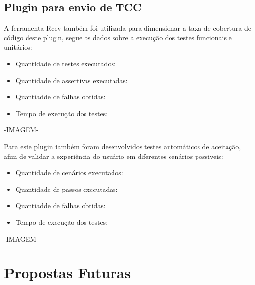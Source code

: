 \subsection{Plugin para envio de TCC}

A ferramenta Rcov também foi utilizada para dimensionar a taxa de cobertura de código deste plugin, segue os dados sobre a execução dos testes funcionais e unitários:

\begin{itemize}
\item Quantidade de testes executados: 
\item Quantidade de assertivas executadas: 
\item Quantiadde de falhas obtidas: 
\item Tempo de execução dos testes: 
\end{itemize}

-IMAGEM-

Para este plugin também foram desenvolvidos testes automáticos de aceitação, afim de validar a experiência do usuário em diferentes cenários possiveis:
\begin{itemize}
\item Quantidade de cenários executados: 
\item Quantidade de passos executadas: 
\item Quantiadde de falhas obtidas: 
\item Tempo de execução dos testes: 
\end{itemize}

-IMAGEM-

\section{Propostas Futuras}


